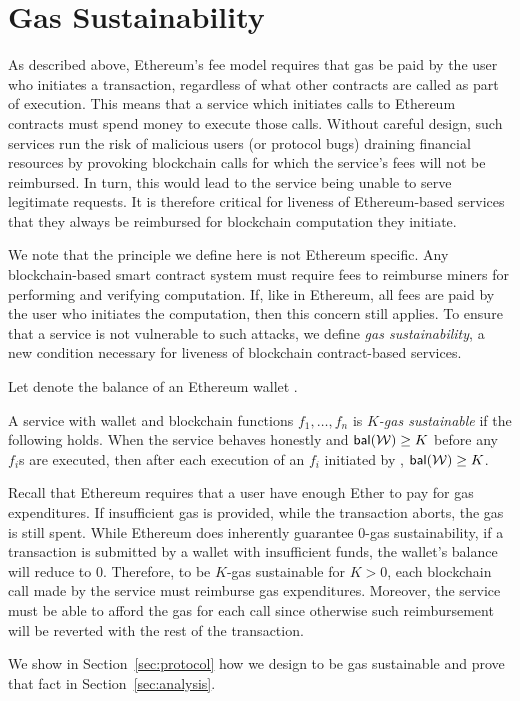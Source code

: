 \section{Gas Sustainability}
\label{sec:gas-sustainability}

As described above, Ethereum's fee model requires that gas be paid by the user who initiates a transaction, regardless of what other contracts are called as part of execution.
This means that a service which initiates calls to Ethereum contracts must spend money to execute those calls.
Without careful design, such services run the risk of malicious users (or protocol bugs) draining financial resources by provoking blockchain calls for which the service's fees will not be reimbursed.
In turn, this would lead to the service being unable to serve legitimate requests.
It is therefore critical for liveness of Ethereum-based services that they always be reimbursed for blockchain computation they initiate.

We note that the principle we define here is not Ethereum specific.
Any blockchain-based smart contract system must require fees to reimburse miners for performing and verifying computation.
If, like in Ethereum, all fees are paid by the user who initiates the computation, then this concern still applies.
To ensure that a service is not vulnerable to such attacks, we define \emph{gas sustainability}, a new condition necessary for liveness of blockchain contract-based services.

Let \bal{\wallet} denote the balance of an Ethereum wallet \wallet.

\begin{definition}
  \label{def:gas-sustainability}
  A service with wallet \wallet and blockchain functions $f_1, \dotsc, f_n$ is \emph{$K$-gas sustainable} if the following holds.
  When the service behaves honestly and $\bal{\wallet} \geq K$ before any $f_i$s are executed,
  then after each execution of an $f_i$ initiated by \wallet, $\bal{\wallet} \geq K$.
\end{definition}

Recall that Ethereum requires that a user have enough Ether to pay for gas expenditures.
If insufficient gas is provided, while the transaction aborts, the gas is still spent.
While Ethereum does inherently guarantee 0-gas sustainability, if a transaction is submitted by a wallet with insufficient funds, the wallet's balance will reduce to 0.
Therefore, to be $K$-gas sustainable for $K > 0$, each blockchain call made by the service must reimburse gas expenditures.
Moreover, the service must be able to afford the gas for each call since otherwise such reimbursement will be reverted with the rest of the transaction.

We show in Section~\ref{sec:protocol} how we design \tc to be gas sustainable and prove that fact in Section~\ref{sec:analysis}.

